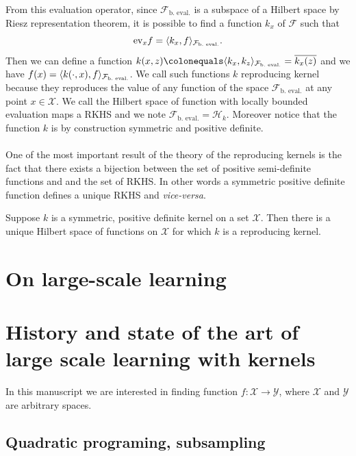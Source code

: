 From this evaluation operator, since $\mathcal{F}_{\text{b.~eval.}}$ is a
subspace of a Hilbert space by Riesz representation theorem, it is possible to
find a function $k_x$ of $\mathcal{F}$ such that
\begin{dmath*}
    \text{ev}_x f = \inner{k_x, f}_{\mathcal{F}_{\text{b.~eval.}}}.
\end{dmath*}
Then we can define a function $k(x, z) \colonequals \inner{k_x,
k_z}_{\mathcal{F}_{\text{b.~eval.}}}=\conj{k_x(z)}$ and we have $f(x) =
\langle k(\cdot, x), f\rangle_{\mathcal{F}_{\text{b.~eval.}}}$. We call such functions
$k$ reproducing kernel because they reproduces the value of any function of the
space $\mathcal{F}_{\text{b.~eval.}}$ at any point $x\in\mathcal{X}$. We call
the Hilbert space of function with locally bounded evaluation maps a \acf{RKHS}
and we note $\mathcal{F}_{\text{b.~eval.}} =\mathcal{H}_k$. Moreover notice
that the function $k$ is by construction symmetric and positive definite.
\paragraph{}
One of the most important result of the theory of the reproducing kernels is
the fact that there exists a bijection between the set of positive
semi-definite functions and and the set of \acl{RKHS}. In other words a
symmetric positive definite function defines a unique \acs{RKHS} and
\emph{vice-versa}.
\begin{theorem}
    Suppose $k$ is a symmetric, positive definite kernel on a set
    $\mathcal{X}$. Then there is a unique Hilbert space of functions on
    $\mathcal{X}$ for which $k$ is a reproducing kernel.
\end{theorem}


\section{On large-scale learning}
\label{sec:on_large-scale_learning}

\section{History and state of the art of large scale learning with kernels}
\label{sec:history}


In this manuscript we are interested in finding function
$f:\mathcal{X}\to\mathcal{Y}$, where $\mathcal{X}$ and $\mathcal{Y}$ are
arbitrary spaces.

\subsection{Quadratic programing, subsampling}


